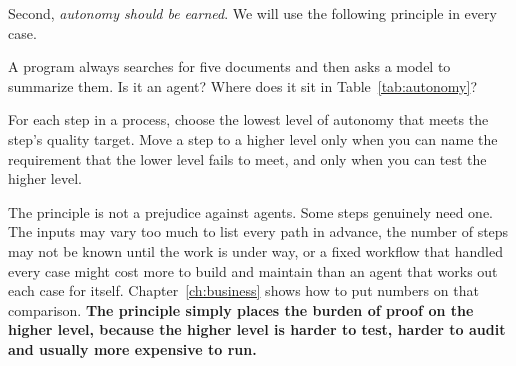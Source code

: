 Second, \emph{autonomy should be earned}. We will use the following principle in every case.

\begin{quickcheck}
A program always searches for five documents and then asks a model to summarize them. Is it an agent? Where does it sit in Table~\ref{tab:autonomy}?
\end{quickcheck}

\begin{principle}
For each step in a process, choose the lowest level of autonomy that meets the step's quality target. Move a step to a higher level only when you can name the requirement that the lower level fails to meet, and only when you can test the higher level.
\end{principle}

The principle is not a prejudice against agents. Some steps genuinely need one. The inputs may vary too much to list every path in advance, the number of steps may not be known until the work is under way, or a fixed workflow that handled every case might cost more to build and maintain than an agent that works out each case for itself. Chapter~\ref{ch:business} shows how to put numbers on that comparison. \textbf{The principle simply places the burden of proof on the higher level, because the higher level is harder to test, harder to audit and usually more expensive to run.}
